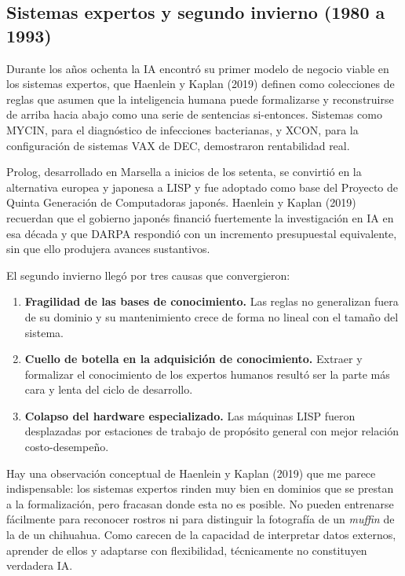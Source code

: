 \documentclass[12pt,letterpaper,oneside]{article}
\begin{document}
\subsection{Sistemas expertos y segundo invierno (1980 a 1993)}

Durante los años ochenta la IA encontró su primer modelo de negocio viable en los sistemas expertos, que Haenlein y Kaplan (2019) definen como colecciones de reglas que asumen que la inteligencia humana puede formalizarse y reconstruirse de arriba hacia abajo como una serie de sentencias si-entonces. Sistemas como MYCIN, para el diagnóstico de infecciones bacterianas, y XCON, para la configuración de sistemas VAX de DEC, demostraron rentabilidad real.

Prolog, desarrollado en Marsella a inicios de los setenta, se convirtió en la alternativa europea y japonesa a LISP y fue adoptado como base del Proyecto de Quinta Generación de Computadoras japonés. Haenlein y Kaplan (2019) recuerdan que el gobierno japonés financió fuertemente la investigación en IA en esa década y que DARPA respondió con un incremento presupuestal equivalente, sin que ello produjera avances sustantivos.

El segundo invierno llegó por tres causas que convergieron:

\begin{enumerate}[leftmargin=1.6cm,itemsep=0.2em]
  \item \textbf{Fragilidad de las bases de conocimiento.} Las reglas no generalizan fuera de su dominio y su mantenimiento crece de forma no lineal con el tamaño del sistema.
  \item \textbf{Cuello de botella en la adquisición de conocimiento.} Extraer y formalizar el conocimiento de los expertos humanos resultó ser la parte más cara y lenta del ciclo de desarrollo.
  \item \textbf{Colapso del hardware especializado.} Las máquinas LISP fueron desplazadas por estaciones de trabajo de propósito general con mejor relación costo-desempeño.
\end{enumerate}

Hay una observación conceptual de Haenlein y Kaplan (2019) que me parece indispensable: los sistemas expertos rinden muy bien en dominios que se prestan a la formalización, pero fracasan donde esta no es posible. No pueden entrenarse fácilmente para reconocer rostros ni para distinguir la fotografía de un \textit{muffin} de la de un chihuahua. Como carecen de la capacidad de interpretar datos externos, aprender de ellos y adaptarse con flexibilidad, técnicamente no constituyen verdadera IA.
\end{document}
